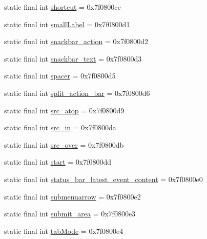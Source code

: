 \begin{DoxyCompactItemize}
static final int \mbox{\hyperlink{classandroid_1_1support_1_1design_1_1_r_1_1id_a9e39fbfaefbdc10d69bb31d13bf4959c}{shortcut}} = 0x7f0800cc
\item 
static final int \mbox{\hyperlink{classandroid_1_1support_1_1design_1_1_r_1_1id_ad269a4dcba96e834b17c3eb9e1900474}{small\+Label}} = 0x7f0800d1
\item 
static final int \mbox{\hyperlink{classandroid_1_1support_1_1design_1_1_r_1_1id_a073bc2a75a5089a68ae23abebbdb13f6}{snackbar\+\_\+action}} = 0x7f0800d2
\item 
static final int \mbox{\hyperlink{classandroid_1_1support_1_1design_1_1_r_1_1id_a1ac0d96909145afa11cdd3489a7adfb0}{snackbar\+\_\+text}} = 0x7f0800d3
\item 
static final int \mbox{\hyperlink{classandroid_1_1support_1_1design_1_1_r_1_1id_a29506b5ea15ea1e16972548834bfc1d9}{spacer}} = 0x7f0800d5
\item 
static final int \mbox{\hyperlink{classandroid_1_1support_1_1design_1_1_r_1_1id_a6a714dbfce5b2bd17ac6888b45bab492}{split\+\_\+action\+\_\+bar}} = 0x7f0800d6
\item 
static final int \mbox{\hyperlink{classandroid_1_1support_1_1design_1_1_r_1_1id_a07a92f1e2e517cc2410d6b29d15e61dd}{src\+\_\+atop}} = 0x7f0800d9
\item 
static final int \mbox{\hyperlink{classandroid_1_1support_1_1design_1_1_r_1_1id_a7561532289295b8b13fecd179ea90562}{src\+\_\+in}} = 0x7f0800da
\item 
static final int \mbox{\hyperlink{classandroid_1_1support_1_1design_1_1_r_1_1id_a736f123ee86e4183fcfb8bd3022ba9b8}{src\+\_\+over}} = 0x7f0800db
\item 
static final int \mbox{\hyperlink{classandroid_1_1support_1_1design_1_1_r_1_1id_a0d737859bafd47bd0319c24213bf40ba}{start}} = 0x7f0800dd
\item 
static final int \mbox{\hyperlink{classandroid_1_1support_1_1design_1_1_r_1_1id_a64ae3efa15896f2f8faa162f61413ed1}{status\+\_\+bar\+\_\+latest\+\_\+event\+\_\+content}} = 0x7f0800e0
\item 
static final int \mbox{\hyperlink{classandroid_1_1support_1_1design_1_1_r_1_1id_a09a95220083150a53dbebd8a8b21e4e1}{submenuarrow}} = 0x7f0800e2
\item 
static final int \mbox{\hyperlink{classandroid_1_1support_1_1design_1_1_r_1_1id_ab333d43c33d6df1b253b423f4c06b51b}{submit\+\_\+area}} = 0x7f0800e3
\item 
static final int \mbox{\hyperlink{classandroid_1_1support_1_1design_1_1_r_1_1id_a28f007351f00cb138e17395355f11f88}{tab\+Mode}} = 0x7f0800e4

\end{DoxyCompactItemize}
